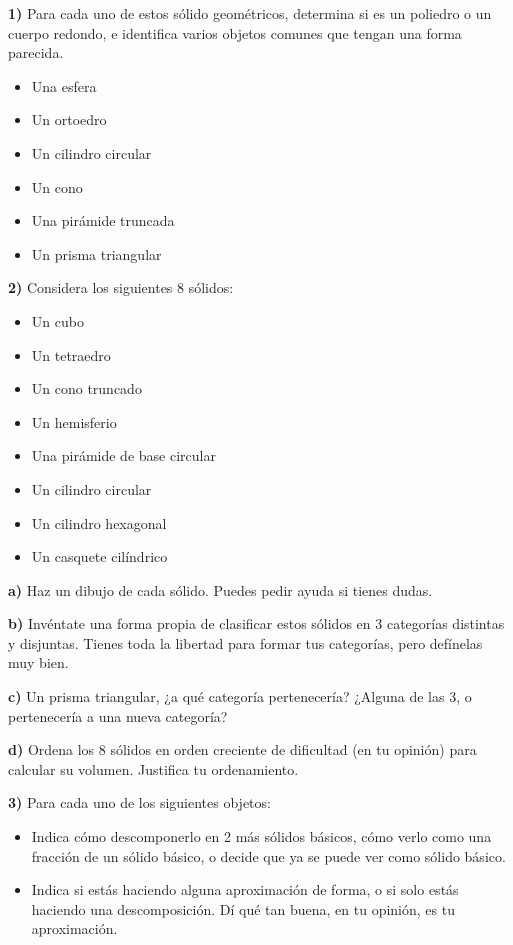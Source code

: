 \documentclass[12pt,a4paper]{article}
\begin{document}
\setlength{\columnseprule}{0.4pt}
\begin{multicols}{2}

\textbf{1)} Para cada uno de estos sólido geométricos, determina si es un poliedro o un cuerpo redondo, e identifica varios objetos comunes que tengan una forma parecida.

\begin{itemize}[nosep]
    \item Una esfera
    \item Un ortoedro
    \item Un cilindro circular
    \item Un cono
    \item Una pirámide truncada
    \item Un prisma triangular
\end{itemize}

\textbf{2)} Considera los siguientes 8 sólidos:

\begin{itemize}[nosep]
    \item Un cubo
    \item Un tetraedro
    \item Un cono truncado
    \item Un hemisferio
    \item Una pirámide de base circular
    \item Un cilindro circular
    \item Un cilindro hexagonal
    \item Un casquete cilíndrico
\end{itemize}

\textbf{a)} Haz un dibujo de cada sólido. Puedes pedir ayuda si tienes dudas.

\textbf{b)} Invéntate una forma propia de clasificar estos sólidos en 3 categorías distintas y disjuntas. Tienes toda la libertad para formar tus categorías, pero defínelas muy bien.

\textbf{c)} Un prisma triangular, ¿a qué categoría pertenecería? ¿Alguna de las 3, o pertenecería a una nueva categoría?

\textbf{d)} Ordena los 8 sólidos en orden creciente de dificultad (en tu opinión) para calcular su volumen. Justifica tu ordenamiento.

\textbf{3)} Para cada uno de los siguientes objetos:

\begin{itemize}[nosep]
    \item Indica cómo descomponerlo en 2 más sólidos básicos, cómo verlo como una fracción de un sólido básico, o decide que ya se puede ver como sólido básico.
    \item Indica si estás haciendo alguna aproximación de forma, o si solo estás haciendo una descomposición. Dí qué tan buena, en tu opinión, es tu aproximación.
\end{itemize}


\end{multicols}
\end{document}
